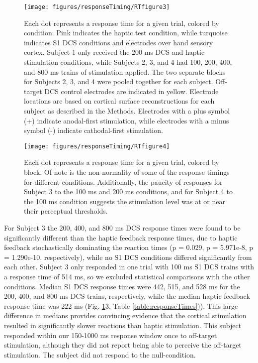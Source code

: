 \begin{figure}[h]
	\centering
	\texttt{[image: figures/responseTiming/RTfigure3]}
	\caption[Comparison of reaction times for four subjects and their DCS electrodes.]{Each dot represents a response time for a given trial, colored by condition. Pink indicates the haptic test condition, while turquoise indicates S1 DCS conditions and electrodes over hand sensory cortex. Subject 1 only received the 200 ms DCS and haptic stimulation conditions, while Subjects 2, 3, and 4 had 100, 200, 400, and 800 ms trains of stimulation applied. The two separate blocks for Subjects 2, 3, and 4 were pooled together for each subject. Off-target DCS control electrodes are indicated in yellow. Electrode locations are based on cortical surface reconstructions for each subject as described in the Methods. Electrodes with a plus symbol (+) indicate anodal-first stimulation, while electrodes with a minus symbol (-) indicate cathodal-first stimulation.}
	\label{fig:RTbySubj}
\end{figure}

\begin{figure}[h]
	\centering
	\texttt{[image: figures/responseTiming/RTfigure4]}
	\caption[Comparison of the two blocked sessions for three subjects.]{Each dot represents a response time for a given trial, colored by block. Of note is the non-normality of some of the response timings for different conditions. Additionally, the paucity of responses for Subject 3 to the 100 ms and 200 ms conditions, and for Subject 4 to the 100 ms condition suggests the stimulation level was at or near their perceptual thresholds.}
	\label{fig:RTbyBlock}
\end{figure}

For Subject 3 the 200, 400, and 800 ms DCS response times were found to be significantly different than the haptic feedback response times, due to haptic feedback stochastically dominating the reaction times (p = 0.029, p = 5.971e-8, p = 1.290e-10, respectively), while no S1 DCS conditions differed significantly from each other. Subject 3 only responded in one trial with 100 ms S1 DCS trains with a response time of 514 ms, so we excluded statistical comparisons with the other conditions. Median S1 DCS response times were 442, 515, and 528 ms for the 200, 400, and 800 ms DCS trains, respectively, while the median haptic feedback response time was 222 ms (Fig. \ref{fig:RTbySubj}3, Table \ref{table:responseTimes})). This large difference in medians provides convincing evidence that the cortical stimulation resulted in significantly slower reactions than haptic stimulation. This subject responded within our 150-1000 ms response window once to off-target stimulation, although they did not report being able to perceive the off-target stimulation. The subject did not respond to the null-condition.

